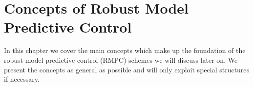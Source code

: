 




\chapter{Concepts of Robust Model Predictive Control}\label{chap:concepts}
%
In this chapter we cover the main concepts which make up the foundation of
the robust model predictive control (RMPC) schemes we will discuss later on.
%
We present the concepts as general as possible and will only exploit special 
structures if necessary.
%

